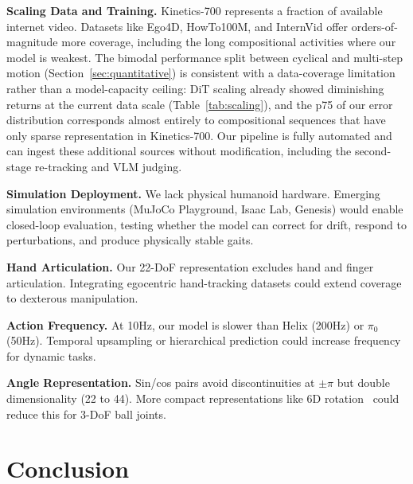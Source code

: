 \documentclass[letterpaper, 10pt, conference]{ieeeconf}
\begin{document}
\textbf{Scaling Data and Training.} Kinetics-700 represents a fraction of available internet video. Datasets like Ego4D, HowTo100M, and InternVid offer orders-of-magnitude more coverage, including the long compositional activities where our model is weakest. The bimodal performance split between cyclical and multi-step motion (Section~\ref{sec:quantitative}) is consistent with a data-coverage limitation rather than a model-capacity ceiling: DiT scaling already showed diminishing returns at the current data scale (Table~\ref{tab:scaling}), and the p75 of our error distribution corresponds almost entirely to compositional sequences that have only sparse representation in Kinetics-700. Our pipeline is fully automated and can ingest these additional sources without modification, including the second-stage re-tracking and VLM judging.

\textbf{Simulation Deployment.} We lack physical humanoid hardware. Emerging simulation environments (MuJoCo Playground, Isaac Lab, Genesis) would enable closed-loop evaluation, testing whether the model can correct for drift, respond to perturbations, and produce physically stable gaits.

\textbf{Hand Articulation.} Our 22-DoF representation excludes hand and finger articulation. Integrating egocentric hand-tracking datasets could extend coverage to dexterous manipulation.

\textbf{Action Frequency.} At 10Hz, our model is slower than Helix (200Hz) or $\pi_0$ (50Hz). Temporal upsampling or hierarchical prediction could increase frequency for dynamic tasks.

\textbf{Angle Representation.} Sin/cos pairs avoid discontinuities at $\pm\pi$ but double dimensionality (22 to 44). More compact representations like 6D rotation~\cite{zhou2019continuity} could reduce this for 3-DoF ball joints.

\section{Conclusion}
\end{document}
